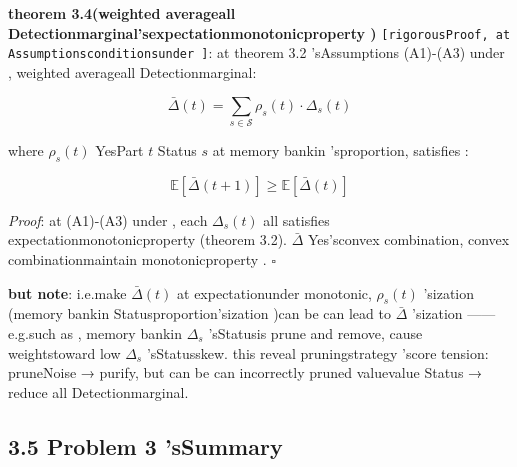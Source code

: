 \documentclass[
  12pt,
]{article}
\begin{document}
\textbf{theorem  3.4(weighted averageall Detectionmarginal'sexpectationmonotonicproperty )}
\texttt{{[}rigorousProof, at Assumptionsconditionsunder {]}}: at theorem  3.2 'sAssumptions (A1)-(A3)
under , weighted averageall Detectionmarginal: 

\[\bar{\Delta}(t) = \sum_{s \in \mathcal{S}} \rho_s(t) \cdot \Delta_s(t)\]

where \(\rho_s(t)\) YesPart \(t\) Status \(s\) at memory bankin 'sproportion, satisfies : 

\[\boxed{\mathbb{E}[\bar{\Delta}(t+1)] \geq \mathbb{E}[\bar{\Delta}(t)]}\]

\emph{Proof}: at  (A1)-(A3) under , each  \(\Delta_s(t)\)
all satisfies expectationmonotonicproperty (theorem  3.2). \(\bar{\Delta}\)
Yes'sconvex combination, convex combinationmaintain monotonicproperty . \(\square\)

\textbf{but note}: i.e.make  \(\bar{\Delta}(t)\) at expectationunder monotonic, \(\rho_s(t)\)
'sization (memory bankin Statusproportion'sization )can be can lead to \(\bar{\Delta}\)
'sization ------e.g.such as , memory bankin  \(\Delta_s\) 'sStatusis prune and remove, cause weightstoward low
\(\Delta_s\) 'sStatusskew. this reveal pruningstrategy 'score tension: pruneNoise →
purify, but can be can incorrectly pruned valuevalue Status → reduce all Detectionmarginal. 

\subsection{3.5 Problem 3 'sSummary}\label{ux95eeux9898-3-ux7684ux603bux7ed3}
\end{document}
